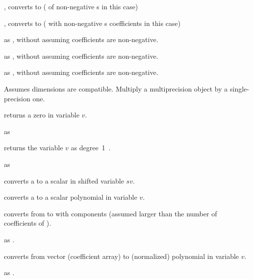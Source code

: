 , converts to  ( of non-negative
s in this case)

, converts to  ( with
non-negative s coefficients in this case)

 as , without assuming
coefficients are non-negative.

 as , without assuming
coefficients are non-negative.

 as , without assuming
coefficients are non-negative.

 Assumes dimensions are compatible.
Multiply a multiprecision object by a single-precision one.








 returns a zero  in variable $v$.

 as 

 returns the variable $v$ as degree~1~.

 as 

 converts a  to a scalar  in shifted variable $sv$.

 converts a  to a scalar
polynomial in variable $v$.

 converts from  to 
with  components (assumed larger than the number of coefficients of
).

 as .

 converts from vector (coefficient
array) to (normalized) polynomial in variable $v$.

 as .

